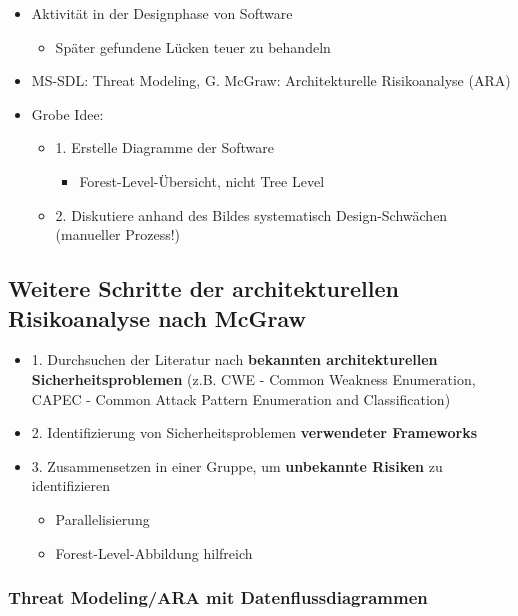 \documentclass[openany]{book}
\begin{document}
\begin{itemize}
    \item Aktivität in der Designphase von Software
    \begin{itemize}
        \item Später gefundene Lücken teuer zu behandeln
    \end{itemize}
    \item MS-SDL: Threat Modeling, G. McGraw: Architekturelle Risikoanalyse (ARA)
    \item Grobe Idee:
    \begin{itemize}
        \item 1. Erstelle Diagramme der Software
        \begin{itemize}
            \item Forest-Level-Übersicht, nicht Tree Level
        \end{itemize}
        \item 2. Diskutiere anhand des Bildes systematisch Design-Schwächen (manueller Prozess!)
    \end{itemize}
\end{itemize}

\subsection{Weitere Schritte der architekturellen Risikoanalyse nach McGraw}

\begin{itemize}
    \item 1. Durchsuchen der Literatur nach \textbf{bekannten architekturellen Sicherheitsproblemen} (z.B. CWE - Common Weakness Enumeration, CAPEC - Common Attack Pattern Enumeration and Classification)
    \item 2. Identifizierung von Sicherheitsproblemen \textbf{verwendeter Frameworks}
    \item 3. Zusammensetzen in einer Gruppe, um \textbf{unbekannte Risiken} zu identifizieren
    \begin{itemize}
        \item Parallelisierung
        \item Forest-Level-Abbildung hilfreich
    \end{itemize}
\end{itemize}

\subsubsection{Threat Modeling/ARA mit Datenflussdiagrammen}
\end{document}
